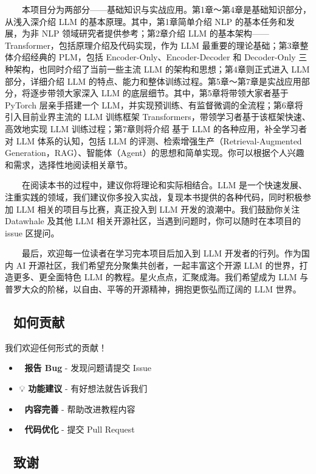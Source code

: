 \documentclass[12pt,a4paper]{book}
\begin{document}
  本项目分为两部分------基础知识与实战应用。第1章～第4章是基础知识部分，从浅入深介绍
LLM 的基本原理。其中，第1章简单介绍 NLP 的基本任务和发展，为非 NLP
领域研究者提供参考；第2章介绍 LLM
的基本架构------Transformer，包括原理介绍及代码实现，作为 LLM
最重要的理论基础；第3章整体介绍经典的 PLM，包括
Encoder-Only、Encoder-Decoder 和 Decoder-Only
三种架构，也同时介绍了当前一些主流 LLM 的架构和思想；第4章则正式进入 LLM
部分，详细介绍 LLM
的特点、能力和整体训练过程。第5章～第7章是实战应用部分，将逐步带领大家深入
LLM 的底层细节。其中，第5章将带领大家者基于 PyTorch 层亲手搭建一个
LLM，并实现预训练、有监督微调的全流程；第6章将引入目前业界主流的 LLM
训练框架 Transformers，带领学习者基于该框架快速、高效地实现 LLM
训练过程；第7章则将介绍 基于 LLM 的各种应用，补全学习者对 LLM
体系的认知，包括 LLM 的评测、检索增强生产（Retrieval-Augmented
Generation，RAG）、智能体（Agent）的思想和简单实现。你可以根据个人兴趣和需求，选择性地阅读相关章节。

  在阅读本书的过程中，建议你将理论和实际相结合。LLM
是一个快速发展、注重实践的领域，我们建议你多投入实战，复现本书提供的各种代码，同时积极参加
LLM 相关的项目与比赛，真正投入到 LLM 开发的浪潮中。我们鼓励你关注
Datawhale 及其他 LLM 相关开源社区，当遇到问题时，你可以随时在本项目的
issue 区提问。

  最后，欢迎每一位读者在学习完本项目后加入到 LLM 开发者的行列。作为国内
AI 开源社区，我们希望充分聚集共创者，一起丰富这个开源 LLM
的世界，打造更多、更全面特色 LLM
的教程。星火点点，汇聚成海。我们希望成为 LLM
与普罗大众的阶梯，以自由、平等的开源精神，拥抱更恢弘而辽阔的 LLM 世界。

\subsection{🤝 如何贡献}\label{ux5982ux4f55ux8d21ux732e}

我们欢迎任何形式的贡献！

\begin{itemize}
\tightlist
\item
  🐛 \textbf{报告 Bug} - 发现问题请提交 Issue
\item
  💡 \textbf{功能建议} - 有好想法就告诉我们
\item
  📝 \textbf{内容完善} - 帮助改进教程内容
\item
  🔧 \textbf{代码优化} - 提交 Pull Request
\end{itemize}

\subsection{🙏 致谢}\label{ux81f4ux8c22}
\end{document}
